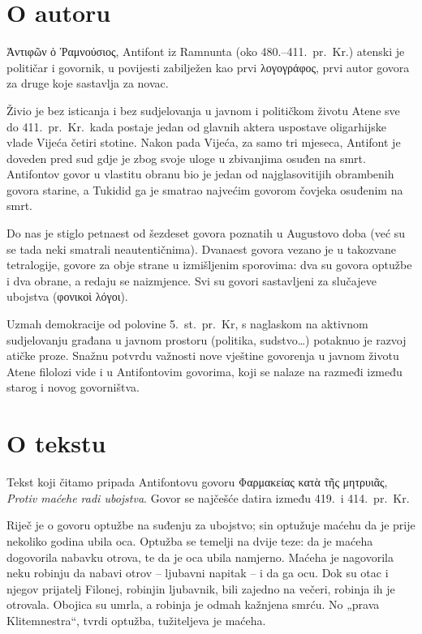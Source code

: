 \section*{O autoru}

\textgreek[variant=ancient]{Ἀντιφῶν ὁ Ῥαμνούσιος,} Antifont iz Ramnunta (oko 480.–411.\ pr.~Kr.) atenski je političar i govornik, u povijesti zabilježen kao prvi \textgreek[variant=ancient]{λογογράφος,} prvi autor govora za druge koje sastavlja za novac.
 
Živio je bez isticanja i bez sudjelovanja u javnom i političkom životu Atene sve do 411.\ pr.~Kr.\ kada postaje jedan od glavnih aktera uspostave oligarhijske vlade Vijeća četiri stotine. Nakon pada Vijeća, za samo tri mjeseca, Antifont je doveden pred sud gdje je zbog svoje uloge u zbivanjima osuđen na smrt. Antifontov govor u vlastitu obranu bio je jedan od najglasovitijih obrambenih govora starine, a Tukidid ga je smatrao najvećim govorom čovjeka osuđenim na smrt.

Do nas je stiglo petnaest od šezdeset govora poznatih u Augustovo doba (već su se tada neki smatrali neautentičnima). Dvanaest govora vezano je u takozvane tetralogije, govore za obje strane u izmišljenim sporovima: dva su govora optužbe i dva obrane, a redaju se naizmjence. Svi su govori sastavljeni za slučajeve ubojstva \textgreek[variant=ancient]{(φονικοὶ λόγοι).}

Uzmah demokracije od polovine 5.~st.\ pr.~Kr, s naglaskom na aktivnom sudjelovanju građana u javnom prostoru (politika, sudstvo…) potaknuo je razvoj atičke proze. Snažnu potvrdu važnosti nove vještine govorenja u javnom životu Atene filolozi vide i u Antifontovim govorima, koji se nalaze na razmeđi između starog i novog govorništva.

\section*{O tekstu}

Tekst koji čitamo pripada Antifontovu govoru \textgreek[variant=ancient]{Φαρμακείας κατὰ τῆς μητρυιᾶς}, \textit{Protiv maćehe radi ubojstva}. Govor se najčešće datira između 419.\ i 414.\ pr.~Kr.

Riječ je o govoru optužbe na suđenju za ubojstvo; sin optužuje maćehu da je prije nekoliko godina ubila oca. Optužba se temelji na dvije teze: da je maćeha dogovorila nabavku otrova, te da je oca ubila namjerno. Maćeha je nagovorila neku robinju da nabavi otrov – ljubavni napitak – i da ga ocu. Dok su otac i njegov  prijatelj Filonej, robinjin ljubavnik, bili zajedno na večeri, robinja ih je otrovala. Obojica su umrla, a robinja je odmah kažnjena smrću. No „prava Klitemnestra“, tvrdi optužba, tužiteljeva je maćeha.

